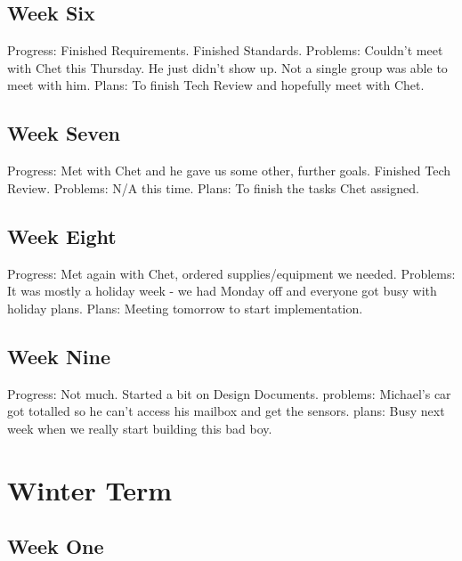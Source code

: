 \documentclass[letterpaper,10pt,draftclsnofoot,onecolumn]{article}
\begin{document}
\subsection{Week Six}

Progress: Finished Requirements. Finished Standards.
\newline
Problems: Couldn't meet with Chet this Thursday. He just didn't show up. Not a single group was able to meet with him.
\newline
Plans: To finish Tech Review and hopefully meet with Chet.

\subsection{Week Seven} 

Progress: Met with Chet and he gave us some other, further goals. Finished Tech Review.
\newline
Problems: N/A this time.
\newline
Plans: To finish the tasks Chet assigned.

\subsection{Week Eight}

Progress: Met again with Chet, ordered supplies/equipment we needed.
\newline
Problems: It was mostly a holiday week - we had Monday off and everyone got busy with holiday plans.
\newline
Plans: Meeting tomorrow to start implementation.

\subsection{Week Nine}

Progress: Not much. Started a bit on Design Documents.
\newline
problems: Michael’s car got totalled so he can’t access his mailbox and get the sensors.
\newline
plans: Busy next week when we really start building this bad boy.

\section{Winter Term}

\subsection{Week One} 
\end{document}
